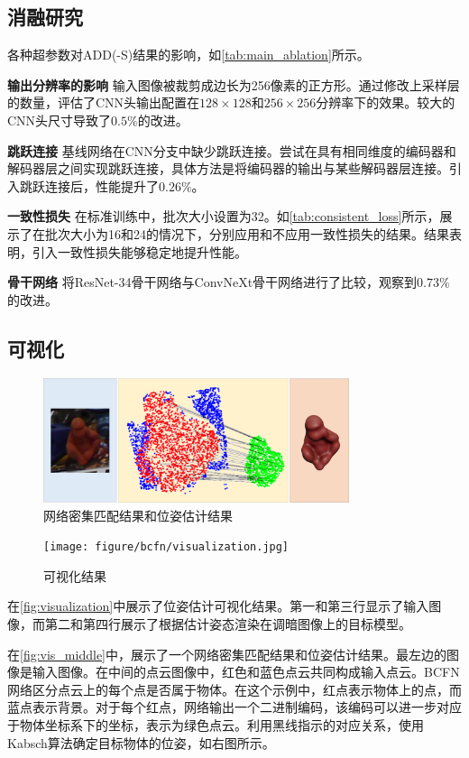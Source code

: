
\subsection{消融研究}


各种超参数对ADD(-S)结果的影响，如\autoref{tab:main_ablation}所示。

\textbf{输出分辨率的影响 }输入图像被裁剪成边长为256像素的正方形。通过修改上采样层的数量，评估了CNN头输出配置在$128 \times 128$和$256 \times 256$分辨率下的效果。较大的CNN头尺寸导致了$0.5\%$的改进。

\textbf{跳跃连接 } 基线网络在CNN分支中缺少跳跃连接。尝试在具有相同维度的编码器和解码器层之间实现跳跃连接，具体方法是将编码器的输出与某些解码器层连接。引入跳跃连接后，性能提升了$0.26\%$。



\textbf{一致性损失 } 在标准训练中，批次大小设置为32。如\autoref{tab:consistent_loss}所示，展示了在批次大小为16和24的情况下，分别应用和不应用一致性损失的结果。结果表明，引入一致性损失能够稳定地提升性能。

\textbf{骨干网络 } 将ResNet-34骨干网络与ConvNeXt骨干网络进行了比较，观察到$0.73\%$的改进。

\subsection{可视化}

\begin{figure}[htbp]
\centerline{\includegraphics[width=0.80\textwidth]{figure/bcfn/vis_middle.jpg}}
    \caption{网络密集匹配结果和位姿估计结果}
    \label{fig:vis_middle}
\end{figure}

\begin{figure}[htbp]
\centerline{\texttt{[image: figure/bcfn/visualization.jpg]}}
    \caption{可视化结果}
    \label{fig:visualization}
\end{figure}

在\autoref{fig:visualization}中展示了位姿估计可视化结果。第一和第三行显示了输入图像，而第二和第四行展示了根据估计姿态渲染在调暗图像上的目标模型。

在\autoref{fig:vis_middle}中，展示了一个网络密集匹配结果和位姿估计结果。最左边的图像是输入图像。在中间的点云图像中，红色和蓝色点云共同构成输入点云。BCFN网络区分点云上的每个点是否属于物体。在这个示例中，红点表示物体上的点，而蓝点表示背景。对于每个红点，网络输出一个二进制编码，该编码可以进一步对应于物体坐标系下的坐标，表示为绿色点云。利用黑线指示的对应关系，使用Kabsch算法确定目标物体的位姿，如右图所示。


